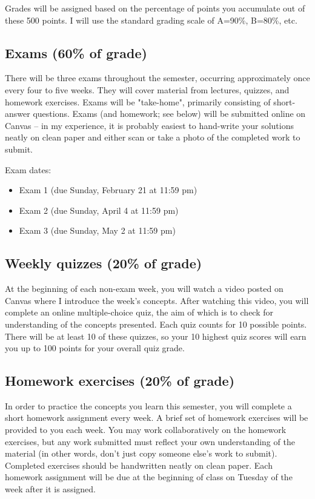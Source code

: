 \documentclass[10pt]{article}
\begin{document}
Grades will be assigned based on the percentage of points you accumulate out of these 500 points.  I will use the standard grading scale of A=90\%, B=80\%, etc.

\subsection*{Exams (60\% of grade)}
\label{sec:org53746dd}
There will be three exams throughout the semester, occurring approximately once every four to five weeks.  They will cover material from lectures, quizzes, and homework exercises. Exams will be "take-home", primarily consisting of short-answer questions. Exams (and homework; see below) will be submitted online on Canvas -- in my experience, it is probably easiest to hand-write your solutions neatly on clean paper and either scan or take a photo of the completed work to submit. 

Exam dates:

\begin{itemize}
\item Exam 1 (due Sunday, February 21 at 11:59 pm)
\item Exam 2 (due Sunday, April 4 at 11:59 pm)
\item Exam 3 (due Sunday, May 2 at 11:59 pm)
\end{itemize}

\subsection*{Weekly quizzes (20\% of grade)}
\label{sec:org145b5bd}

At the beginning of each non-exam week, you will watch a video posted on Canvas where I introduce the week's concepts. After watching this video, you will complete an online multiple-choice quiz, the aim of which is to check for understanding of the concepts presented. Each quiz counts for 10 possible points. There will be at least 10 of these quizzes, so your 10 highest quiz scores will earn you up to 100 points for your overall quiz grade.

\subsection*{Homework exercises (20\% of grade)}
\label{sec:org5852edd}
In order to practice the concepts you learn this semester, you will complete a short homework assignment every week. A brief set of homework exercises will be provided to you each week. You may work collaboratively on the homework exercises, but any work submitted must reflect your own understanding of the material (in other words, don't just copy someone else's work to submit). Completed exercises should be handwritten neatly on clean paper. Each homework assignment will be due at the beginning of class on Tuesday of the week after it is assigned.
\end{document}
